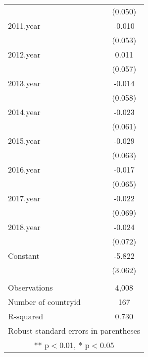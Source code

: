 \begin{tabular}{lc}
 & (0.050) \\
2011.year & -0.010 \\
 & (0.053) \\
2012.year & 0.011 \\
 & (0.057) \\
2013.year & -0.014 \\
 & (0.058) \\
2014.year & -0.023 \\
 & (0.061) \\
2015.year & -0.029 \\
 & (0.063) \\
2016.year & -0.017 \\
 & (0.065) \\
2017.year & -0.022 \\
 & (0.069) \\
2018.year & -0.024 \\
 & (0.072) \\
Constant & -5.822 \\
 & (3.062) \\
 &  \\
Observations & 4,008 \\
Number of countryid & 167 \\
 R-squared & 0.730 \\ \hline
\multicolumn{2}{c}{ Robust standard errors in parentheses} \\
\multicolumn{2}{c}{ ** p$<$0.01, * p$<$0.05} \\
\end{tabular}

